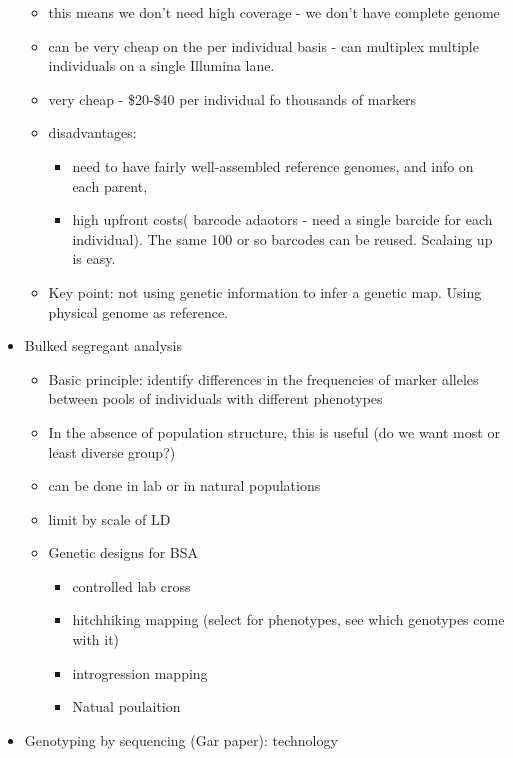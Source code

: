 \documentclass{article}
\begin{document}
\begin{itemize}
\begin{itemize}
            \item this means we don't need high coverage - we don't have complete genome
            \item can be very cheap on the per individual basis - can multiplex multiple individuals on a single Illumina lane.
            \item very cheap - \$20-\$40 per individual fo thousands of markers
            \item disadvantages:
            \begin{itemize}
                \item need to have fairly well-assembled reference genomes, and info on each parent,
                \item high upfront costs( barcode adaotors - need a single barcide for each individual).  The same 100 or so barcodes can be reused.  Scalaing up is easy.
            \end{itemize}
            \item Key point: not using genetic information to infer a genetic map.  Using physical genome as reference.
        \end{itemize}
        \item Bulked segregant analysis
        \begin{itemize}
            \item Basic principle: identify differences in the frequencies of marker alleles between pools of individuals with different phenotypes
            \item In the absence of population structure, this is useful (do we want most or least diverse group?)
            \item can be done in lab or in natural populations
            \item limit by scale of LD
            \item Genetic designs for BSA
            \begin{itemize}
                \item controlled lab cross
                \item hitchhiking mapping (select for phenotypes, see which genotypes come with it)
                \item introgression mapping
                \item Natual poulaition
            \end{itemize}
        \end{itemize}
        \item Genotyping by sequencing (Gar paper): technology

\end{itemize}
\end{document}
